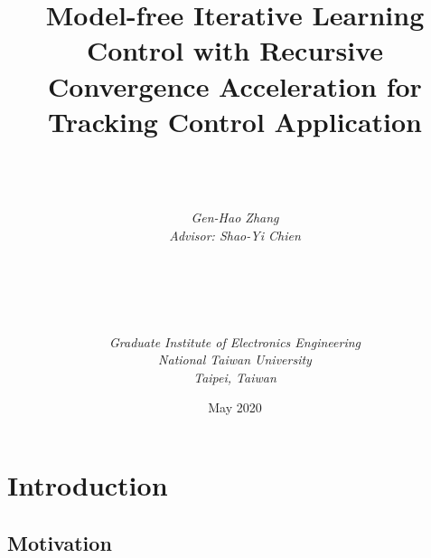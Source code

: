 \documentclass[a4paper, 12pt, twoside, openright]{mythesis}
\begin{document}
\title{\textbf{Model-free Iterative Learning Control with Recursive Convergence Acceleration for Tracking Control Application}}


\author{ \\  \\ \\
{\it Gen-Hao Zhang}\\
{\it Advisor: Shao-Yi Chien} \\ \\ \\ \\  \\ \\
{\it Graduate Institute of Electronics Engineering}\\
{\it National Taiwan University} \\
{\it Taipei, Taiwan}\\ }

{\date{May 2020}}

\maketitle

\frontmatter

\tableofcontents
\listoffigures
\listoftables


\mainmatter








\chapter{Introduction}
\label{ch:intro}

\section{Motivation}
\label{sec:Motivation}
\end{document}
